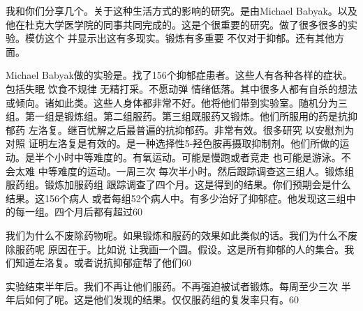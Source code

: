我和你们分享几个。关于这种生活方式的影响的研究。是由Michael Babyak。以及他在杜克大学医学院的同事共同完成的。这是个很重要的研究。做了很多很多的实验。模仿这个 并显示出这有多现实。锻炼有多重要 不仅对于抑郁。还有其他方面。 

Michael Babyak做的实验是。找了156个抑郁症患者。这些人有各种各样的症状。包括失眠 饮食不规律 无精打采。不愿动弹 情绪低落。其中很多人都有自杀的想法或倾向。诸如此类。这些人身体都非常不好。他将他们带到实验室。随机分为三组。第一组是锻炼组。第二组服药。第三组既服药又锻炼。他们所服用的药是抗抑郁药 左洛复。继百忧解之后最普遍的抗抑郁药。非常有效。很多研究 以安慰剂为对照 证明左洛复是有效的。是一种选择性5-羟色胺再摄取抑制剂。他们所做的运动。是半个小时中等难度的。有氧运动。可能是慢跑或者竞走 也可能是游泳。不会太难 中等难度的运动。一周三次 每次半小时。然后跟踪调查这三组人。锻炼组 服药组。锻炼加服药组 跟踪调查了四个月。这是得到的结果。你们预期会是什么结果。这156个病人 或者每组52个病人中。有多少治好了抑郁症。他发现这三组中的每一组。四个月后都有超过60%

我们为什么不废除药物呢。如果锻炼和服药的效果如此类似的话。我们为什么不废除服药呢 原因在于。比如说 让我画一个圆。假设。这是所有抑郁的人的集合。我们知道左洛复。或者说抗抑郁症帮了他们60%

实验结束半年后。我们不再让他们服药。不再强迫被试者锻炼。每周至少三次 半年后如何了呢。这是他们发现的结果。仅仅服药组的复发率只有。60%

